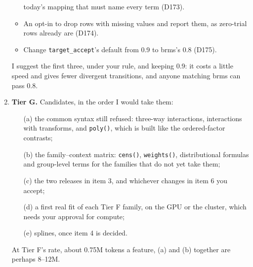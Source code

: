 \documentclass[11pt]{article}
\newcommand{\code}[1]{\texttt{#1}}
\begin{document}
\begin{enumerate}
\begin{itemize}
    today's mapping that must name every term (D173).
  \item An opt-in to drop rows with missing values and report them, as zero-trial rows already are (D174).
  \item Change \code{target\_accept}'s default from 0.9 to brms's 0.8 (D175).
  \end{itemize}
  I suggest the first three, under your rule, and keeping 0.9: it costs a little speed and gives fewer divergent
  transitions, and anyone matching brms can pass 0.8.
\item \textbf{Tier G.} Candidates, in the order I would take them:
  \begin{enumerate}
  \item[(a)] the common syntax still refused: three-way interactions, interactions with transforms, and \code{poly()},
    which is built like the ordered-factor contrasts;
  \item[(b)] the family--context matrix: \code{cens()}, \code{weights()}, distributional formulas and group-level terms
    for the families that do not yet take them;
  \item[(c)] the two releases in item 3, and whichever changes in item 6 you accept;
  \item[(d)] a first real fit of each Tier F family, on the GPU or the cluster, which needs your approval for compute;
  \item[(e)] splines, once item 4 is decided.
  \end{enumerate}
  At Tier F's rate, about 0.75M tokens a feature, (a) and (b) together are perhaps 8--12M.
\end{enumerate}
\end{document}
